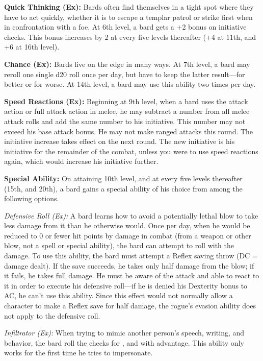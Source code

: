 \textbf{Quick Thinking (Ex):} Bards often find themselves in a tight spot where they have to act quickly, whether it is to escape a templar patrol or strike first when in confrontation with a foe. At 6th level, a bard gets a +2 bonus on initiative checks. This bonus increases by 2 at every five levels thereafter (+4 at 11th, and +6 at 16th level).


\textbf{Chance (Ex):} Bards live on the edge in many ways. At 7th level, a bard may reroll one single d20 roll once per day, but have to keep the latter result---for better or for worse. At 14th level, a bard may use this ability two times per day.


\textbf{Speed Reactions (Ex):} Beginning at 9th level, when a bard uses the attack action or full attack action in melee, he may subtract a number from all melee attack rolls and add the same number to his initiative. This number may not exceed his base attack bonus. He may not make ranged attacks this round. The initiative increase takes effect on the next round. The new initiative is his initiative for the remainder of the combat, unless you were to use speed reactions again, which would increase his initiative further.


\textbf{Special Ability:} On attaining 10th level, and at every five levels thereafter (15th, and 20th), a bard gains a special ability of his choice from among the following options.

\textit{Defensive Roll (Ex):} A bard learns how to avoid a potentially lethal blow to take less damage from it than he otherwise would. Once per day, when he would be reduced to 0 or fewer hit points by damage in combat (from a weapon or other blow, not a spell or special ability), the bard can attempt to roll with the damage. To use this ability, the bard must attempt a Reflex saving throw (DC = damage dealt). If the save succeeds, he takes only half damage from the blow; if it fails, he takes full damage. He must be aware of the attack and able to react to it in order to execute his defensive roll---if he is denied his Dexterity bonus to AC, he can't use this ability. Since this effect would not normally allow a character to make a Reflex save for half damage, the rogue's evasion ability does not apply to the defensive roll.

\textit{Infiltrator (Ex):} When trying to mimic another person's speech, writing, and behavior, the bard roll the checks for ,  and  with advantage. This ability only works for the first time he tries to impersonate.

